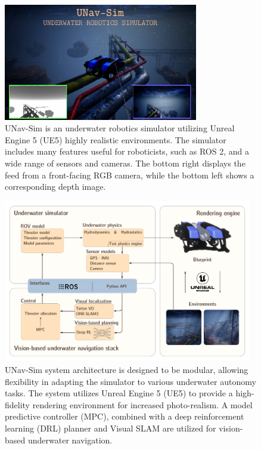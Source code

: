 



\begin{figure}[t]
    \centering
    \includegraphics[width=8.5cm]{Phd_thesis/figures/UWRS_pipe.pdf}
    \caption{UNav-Sim is an underwater robotics simulator utilizing Unreal Engine 5 (UE5) highly realistic environments. The simulator includes many features useful for roboticists, such as ROS 2, and a wide range of sensors and cameras. The bottom right displays the feed from a front-facing RGB camera, while the bottom left shows a corresponding depth image.}
    \label{fig:uwrs}
\end{figure}



\begin{figure}[!t]
    \centering
    \includegraphics[width=0.97\textwidth]{figures/abstract4.pdf}
    \caption{UNav-Sim system architecture is designed to be modular, allowing flexibility in adapting the simulator to various underwater autonomy tasks. The system utilizes Unreal Engine 5 (UE5) to provide a high-fidelity rendering environment for increased photo-realism.  A model predictive controller (MPC), combined with a deep reinforcement learning (DRL) planner and Visual \ac{SLAM} are utilized for vision-based underwater navigation.   }
    \label{fig:abstract} 
\end{figure}


